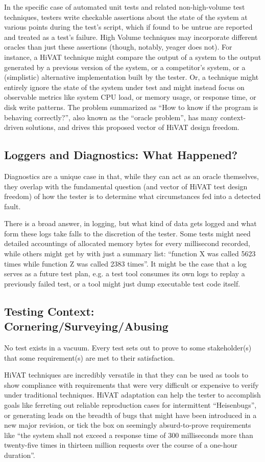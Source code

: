 In the specific case of automated unit tests and related non-high-volume test techniques, testers write checkable assertions about the state of the system at various points during the test's script, which if found to be untrue are reported and treated as a test's failure. High Volume techniques may incorporate different oracles than just these assertions (though, notably, yeager does not). For instance, a HiVAT technique might compare the output of a system to the output generated by a previous version of the system, or a competitor's system, or a (simplistic) alternative implementation built by the tester. Or, a technique might entirely ignore the state of the system under test and might instead focus on observable metrics like system CPU load, or memory usage, or response time, or disk write patterns. The problem summarized as ``How to know if the program is behaving correctly?'', also known as the ``oracle problem'', has many context-driven solutions, and drives this proposed vector of HiVAT design freedom.

\subsection{Loggers and Diagnostics: What Happened?}
Diagnostics are a unique case in that, while they can act as an oracle themselves, they overlap with the fundamental question (and vector of HiVAT test design freedom) of how the tester is to determine what circumstances fed into a detected fault.

There is a broad answer, in logging, but what kind of data gets logged and what form these logs take falls to the discretion of the tester. Some tests might need detailed accountings of allocated memory bytes for every millisecond recorded, while others might get by with just a summary list: ``function X was called 5623 times while function Z was called 2383 times''. It might be the case that a log serves as a future test plan, e.g. a test tool consumes its own logs to replay a previously failed test, or a tool might just dump executable test code itself.

\subsection{Testing Context: Cornering/Surveying/Abusing}
No test exists in a vacuum. Every test sets out to prove to some stakeholder(s) that some requirement(s) are met to their satisfaction.

HiVAT techniques are incredibly versatile in that they can be used as tools to show compliance with requirements that were very difficult or expensive to verify under traditional techniques. HiVAT adaptation can help the tester to accomplish goals like ferreting out reliable reproduction cases for intermittent ``Heisenbugs'', or generating leads on the breadth of bugs that might have been introduced in a new major revision, or tick the box on seemingly absurd-to-prove requirements like ``the system shall not exceed a response time of 300 milliseconds more than twenty-five times in thirteen million requests over the course of a one-hour duration''.

